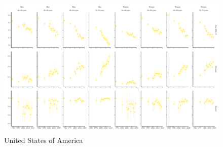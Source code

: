 \documentclass[12pt]{article}
\begin{document}
\begin{appendix}
\begin{landscape}
        \begin{figure}[H]
            \centering
            \includegraphics[width=\linewidth]{../3_figures/countries/fig_united states of america.pdf}
            \caption{United States of America}
            \label{fig:usa}
        \end{figure}
    \end{landscape}


\end{appendix}

\end{document}
